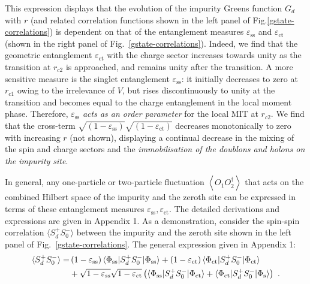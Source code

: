 This expression displays that the evolution of the impurity Greens function $G_{d}$ 
with $r$ (and related correlation functions shown in the left panel of Fig.\eqref{gstate-correlations}) is dependent on that of the entanglement measures $\varepsilon_{\text{ss}}$ and $\varepsilon_{\text{ct}}$ (shown in the right panel of Fig.~\eqref{gstate-correlations}). 
Indeed, we find that the geometric entanglement \(\varepsilon_\text{ct}\) with the charge sector increases towards unity as the transition at \(r_{c2}\) is approached, and remains unity after the transition. A more sensitive measure is the singlet entanglement \(\varepsilon_\text{ss}\): it initially decreases to zero at \(r_{c1}\) owing to the irrelevance of \(V\), but rises discontinuously to unity at the transition and becomes equal to the charge entanglement in the local moment phase.
Therefore, \(\varepsilon_\text{ss}\) {\it acts as an order parameter} for the local MIT at \(r_{c2}\). We find that the cross-term \(\sqrt{\left(1 - \varepsilon_\text{ss} \right)}\sqrt{\left(1 - \varepsilon_\text{ct} \right)}\) decreases monotonically to zero with increasing \(r\) (not shown), displaying a continual decrease in the mixing of the spin and charge sectors and the {\it immobilisation of the doublons and holons on the impurity site}. 

In general, any one-particle or two-particle fluctuation \(\left<O_1 O_2^\dagger \right>\) that acts on the combined Hilbert space of the impurity and the zeroth site can be expressed in terms of these entanglement measures \(\varepsilon_\text{ss},\varepsilon_\text{ct}\). The detailed derivations and expressions are given in Appendix 1. As a demonstration, consider the spin-spin correlation $\langle S_{d}^{+}S_{0}^{-}\rangle$ between the impurity and the zeroth site shown in the left panel of Fig.~\eqref{gstate-correlations}. The general expression given in Appendix 1:
\begin{eqnarray}
	\braket{S_{d}^{+}S_{0}^{-}} =& \left(1 - \varepsilon_\text{ss}\right) \braket{\Phi_\text{ss} | S_d^+ S_0^- | \Phi_\text{ss}} + \left(1 - \varepsilon_\text{ct}\right) \braket{\Phi_\text{ct} | S_d^+ S_0^- | \Phi_\text{ct}} \nonumber \\
				      &+ \sqrt{1 - \varepsilon_\text{ss}}\sqrt{1 - \varepsilon_\text{ct}}\left(\braket{\Phi_\text{ss} | S_d^+ S_0^- | \Phi_\text{ct}} + \braket{\Phi_\text{ct} | S_d^+ S_0^- | \Phi_\text{s}}\right)~.
\end{eqnarray}

